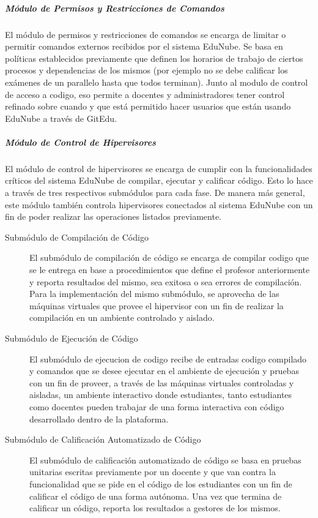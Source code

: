 \subparagraph{Módulo de Permisos y Restricciones de Comandos}
El módulo de permisos y restricciones de comandos se encarga de limitar o permitir comandos externos recibidos por el sistema EduNube. Se basa en políticas establecidos previamente que definen los horarios de trabajo de ciertos procesos y dependencias de los mismos (por ejemplo no se debe calificar los exámenes de un parallelo hasta que todos terminan). Junto al modulo de control de acceso a codigo, eso permite a docentes y administradores tener control refinado sobre cuando y que está permitido hacer usuarios que están usando EduNube a través de GitEdu.

\subparagraph{Módulo de Control de Hipervisores}
El módulo de control de hipervisores se encarga de cumplir con la funcionalidades críticos del sistema EduNube de compilar, ejecutar y calificar código. Esto lo hace a través de tres respectivos submódulos para cada fase. De manera más general, este módulo también controla hipervisores conectados al sistema EduNube con un fin de poder realizar las operaciones listados previamente.
\begin{description}
	\item[Submódulo de Compilación de Código]
	El submódulo de compilación de código se encarga de compilar codigo que se le entrega en base a procedimientos que define el profesor anteriormente y reporta resultados del mismo, sea exitosa o sea errores de compilación. Para la implementación del mismo submódulo, se aprovecha de las máquinas virtuales que provee el hipervisor con un fin de realizar la compilación en un ambiente controlado y aislado.
    \item[Submódulo de Ejecución de Código]
	El submódulo de ejecucion de codigo recibe de entradas codigo compilado y comandos que se desee ejecutar en el ambiente de ejecución y pruebas con un fin de proveer, a través de las máquinas virtuales controladas y aisladas, un ambiente interactivo donde estudiantes, tanto estudiantes como docentes pueden trabajar de una forma interactiva con código desarrollado dentro de la plataforma.
    \item[Submódulo de Calificación Automatizado de Código]
	El submódulo de calificación automatizado de código se basa en pruebas unitarias escritas previamente por un docente y que van contra la funcionalidad que se pide en el código de los estudiantes con un fin de calificar el código de una forma autónoma. Una vez que termina de calificar un código, reporta los resultados a gestores de los mismos.
\end{description}

